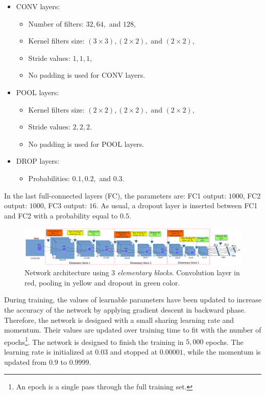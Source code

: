 \documentclass[10pt]{article}
\begin{document}
\begin{itemize}[nosep,label=\footnotesize$\bullet$]

\item CONV layers:
		\begin{itemize}[nosep]
			\item Number of filters: $32, 64,$ and $128$,
			\item Kernel filters size: $(3 \times 3), (2 \times 2),$ and $(2 \times 2)$,
			\item Stride values: $1, 1, 1$,
			\item No padding is used for CONV layers.
		\end{itemize}			
	\item POOL layers:
		\begin{itemize}[nosep]
			\item Kernel filters size: $(2 \times 2), (2 \times 2),$ and $(2 \times 2)$,
			\item Stride values: $2, 2, 2$.
			\item No padding is used for POOL layers.
		\end{itemize}
	\item DROP layers: 
		\begin{itemize}[nosep]
			\item Probabilities: $0.1, 0.2, $ and $0.3$.
		\end{itemize}
	\end{itemize}
In the last full-connected layers (FC), the parameters are: FC1 output:
$1000$, FC2 output: $1000$, FC3  output: $16$. As usual, a dropout layer is
inserted between FC1 and FC2 with a probability equal to $0.5$.


\begin{figure}[!t]
\centering
\includegraphics[scale=0.32]{images/arch_model}
\caption{{\small{Network architecture using $3$ \textit{elementary blocks}.
  Convolution
  layer in red, pooling in yellow and dropout in green color.}}} 
\label{cnnnetwork2}
\end{figure}

During training, the values of learnable parameters have been updated
to increase the accuracy of the network by applying gradient descent
in backward phase. Therefore, the network is designed with a small
sharing learning rate and momentum. Their values are updated over
training time to fit with the number of epochs\footnote{An epoch is a
  single pass through the full training set.}. The network is designed
to finish the training in $5,000$ epochs. The learning rate is
initialized at $0.03$ and stopped at $0.00001$, while the momentum is
updated from $0.9$ to $0.9999$.
\end{document}
